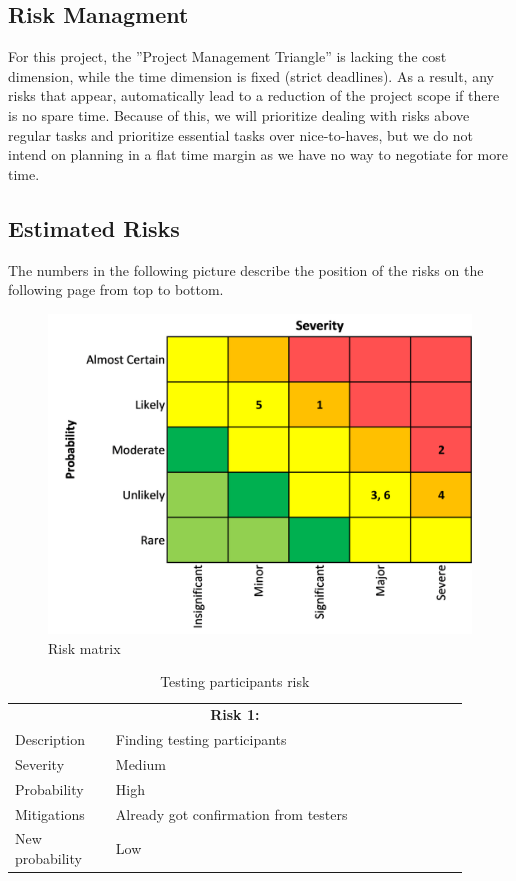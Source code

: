 \subsection{Risk Managment}
For this project, the ”Project Management Triangle” is lacking the cost dimension, while the time dimension is fixed (strict deadlines). As a result, any risks that appear, automatically lead to a reduction of the project scope if there is no spare time. Because of this, we will prioritize dealing with risks above regular tasks and prioritize essential tasks over nice-to-haves, but we do not intend on planning in a flat time margin as we have no way to negotiate for more time.

\subsection{Estimated Risks}
The numbers in the following picture describe the position of the risks on the following page from top to bottom.

\begin{figure}[H]
  \includegraphics[width=\linewidth]{resources/risks-matrix.png}
  \caption{Risk matrix}
  \label{risk_matrix}
\end{figure}

\begin{table}
  \centering
  \begin{tabular}{|p{0.2\linewidth}p{0.7\linewidth}|}
    \hline
    \multicolumn{2}{|c|}{\textbf{Risk 1:}}                     \\
    Description     & Finding testing participants           \\
    Severity        & Medium                                 \\
    Probability     & High                                   \\
    Mitigations     & Already got confirmation from testers  \\
    New probability & Low                                    \\
    \hline                           
  \end{tabular}
  \caption{Testing participants risk}
\end{table}

